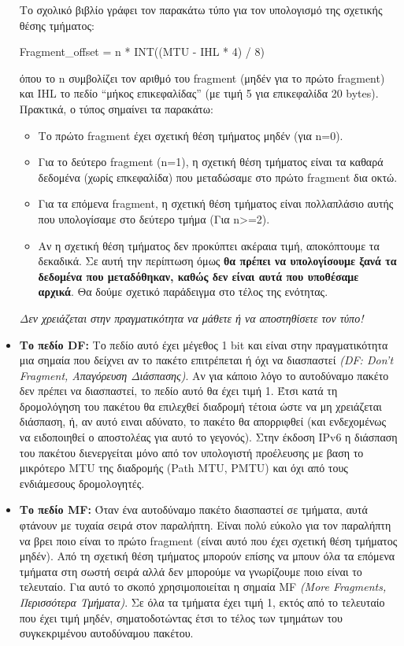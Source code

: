 \begin{itemize}
Το σχολικό βιβλίο γράφει τον παρακάτω τύπο για τον υπολογισμό της σχετικής θέσης τμήματος:

\begin{center}
Fragment\_offset = n * INT((MTU - IHL * 4) / 8)
\end{center}

όπου το n συμβολίζει τον αριθμό του fragment (μηδέν για το πρώτο fragment) και IHL το πεδίο ``μήκος επικεφαλίδας'' (με τιμή 5 για επικεφαλίδα 20 bytes). Πρακτικά, ο τύπος σημαίνει τα παρακάτω:

\begin{itemize}
\item Το πρώτο fragment έχει σχετική θέση τμήματος μηδέν (για n=0).
\item Για το δεύτερο fragment (n=1), η σχετική θέση τμήματος είναι τα καθαρά δεδομένα (χωρίς επκεφαλίδα) που μεταδώσαμε στο πρώτο fragment δια οκτώ.
\item Για τα επόμενα fragment, η σχετική θέση τμήματος είναι πολλαπλάσιο αυτής που υπολογίσαμε στο δεύτερο τμήμα (Για n>=2).
\item Αν η σχετική θέση τμήματος δεν προκύπτει ακέραια τιμή, αποκόπτουμε τα δεκαδικά. Σε αυτή την περίπτωση όμως \textbf{θα πρέπει να υπολογίσουμε ξανά τα δεδομένα που μεταδόθηκαν, καθώς δεν είναι αυτά που υποθέσαμε αρχικά}. Θα δούμε σχετικό παράδειγμα στο τέλος της ενότητας.
\end{itemize}

\emph{Δεν χρειάζεται στην πραγματικότητα να μάθετε ή να αποστηθίσετε τον τύπο!}

\item \textbf{Το πεδίο DF:} Το πεδίο αυτό έχει μέγεθος 1 bit και είναι στην πραγματικότητα μια σημαία που δείχνει αν το πακέτο επιτρέπεται ή όχι να διασπαστεί \emph{(DF: Don't Fragment, Απαγόρευση Διάσπασης)}. Αν για κάποιο λόγο το αυτοδύναμο πακέτο δεν πρέπει να διασπαστεί, το πεδίο αυτό θα έχει τιμή 1.  Έτσι κατά τη δρομολόγηση του πακέτου θα επιλεχθεί διαδρομή τέτοια ώστε να μη χρειάζεται διάσπαση, ή, αν αυτό ειναι αδύνατο, το πακέτο θα απορριφθεί (και ενδεχομένως να ειδοποιηθεί ο αποστολέας για αυτό το γεγονός). Στην έκδοση IPv6 η διάσπαση του πακέτου διενεργείται μόνο από τον υπολογιστή προέλευσης με βαση το μικρότερο MTU της διαδρομής (Path MTU, PMTU) και όχι από τους ενδιάμεσους δρομολογητές. 
 
\item \textbf{Το πεδίο MF:} Όταν ένα αυτοδύναμο πακέτο διασπαστεί σε τμήματα, αυτά φτάνουν με τυχαία σειρά στον παραλήπτη. Είναι πολύ εύκολο για τον παραλήπτη να βρει ποιο είναι το πρώτο fragment (είναι αυτό που έχει σχετική θέση τμήματος μηδέν). Από τη σχετική θέση τμήματος μπορούν επίσης να μπουν όλα τα επόμενα τμήματα στη σωστή σειρά αλλά δεν μπορούμε να γνωρίζουμε ποιο είναι το τελευταίο. Για αυτό το σκοπό χρησιμοποιείται η σημαία MF \emph{(More Fragments, Περισσότερα Τμήματα)}. Σε όλα τα τμήματα έχει τιμή 1, εκτός από το τελευταίο που έχει τιμή μηδέν, σηματοδοτώντας έτσι το τέλος των τμημάτων του συγκεκριμένου αυτοδύναμου πακέτου.
\end{itemize} 
